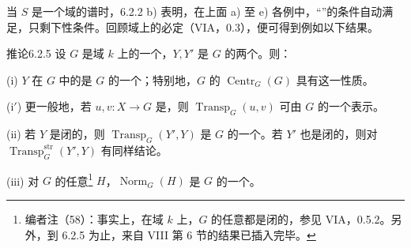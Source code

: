 当 $S$ 是一个域的谱时，6.2.2 b) 表明，在上面 a) 至 e) 各例中，“”的条件自动满足，只剩下性条件。回顾域上的必定（VIA，0.3），便可得到例如以下结果。
\begin{SGAresult}{推论}{6.2.5}
设 $G$ 是域 $k$ 上的一个，$Y,Y'$ 是 $G$ 的两个。则：

(i) $Y$ 在 $G$ 中的是 $G$ 的一个；特别地，$G$ 的 $\operatorname{Centr}_G(G)$ 具有这一性质。

(i$'$) 更一般地，若 $u,v:X\to G$ 是，则 $\operatorname{Transp}_G(u,v)$ 可由 $G$ 的一个表示。

(ii) 若 $Y$ 是闭的，则 $\operatorname{Transp}_G(Y',Y)$ 是 $G$ 的一个。若 $Y'$ 也是闭的，则对 $\operatorname{Transp}^{\mathrm{str}}_G(Y',Y)$ 有同样结论。

(iii) 对 $G$ 的任意\footnote{编者注（58）：事实上，在域 $k$ 上，$G$ 的任意都是闭的，参见 VIA，0.5.2。另外，到 6.2.5 为止，来自 VIII 第 6 节的结果已插入完毕。} $H$，$\operatorname{Norm}_G(H)$ 是 $G$ 的一个。
\end{SGAresult}

